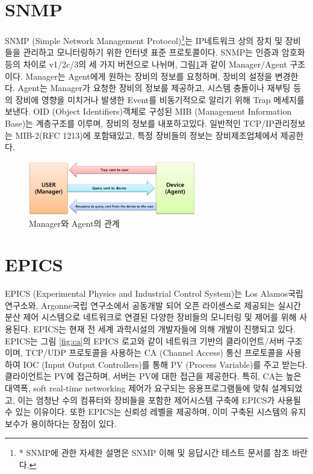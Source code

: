 \documentclass[11pt
  , a4paper
  , article
  , oneside
]{memoir}
\begin{document}
\section{SNMP}
SNMP (Simple Network Management Protocol)\footnote{* SNMP에 관한 자세한 설명은 SNMP 이해 및 응답시간 테스트 문서를 참조 바란다.}는 IP네트워크 상의 장치 및 장비들을 관리하고 모니터링하기 위한 인터넷 표준 프로토콜이다\citep{snmp}. SNMP는 인증과 암호화 등의 차이로 v1/2c/3의 세 가지 버전으로 나뉘며, 그림\ref{fig:relationship_m_a}과 같이 Manager/Agent 구조이다\citep{snmpm_a}. Manager는 Agent에게 원하는 장비의 정보를 요청하며, 장비의 설정을 변경한다. Agent는 Manager가 요청한 장비의 정보를 제공하고, 시스템 충돌이나 재부팅 등의 장비에 영향을 미치거나 발생한 Event를 비동기적으로 알리기 위해 Trap 메세지를 보낸다. OID (Object Identifiers)객체로 구성된 MIB (Management Information Base)는 계층구조를 이루며, 장비의 정보를 내포하고있다. 일반적인 TCP/IP관리정보는 MIB-2(RFC 1213)에 포함돼있고, 특정 장비들의 정보는 장비제조업체에서 제공한다. 

\begin{figure}[h!]
  \centering
  \includegraphics[width=0.65\textwidth]{./images/relationship_m_a.eps}
  \caption{Manager와 Agent의 관계}
  \label{fig:relationship_m_a}   
\end{figure}

\hfill

\section{EPICS}
EPICS (Experimental Physics and Industrial Control System)는 Los Alamos국립 연구소와, Argonne국립 연구소에서 공동개발 되어 오픈 라이센스로 제공되는 실시간 분산 제어 시스템으로 네트워크로 연결된 다양한 장비들의 모니터링 및 제어를 위해 사용된다. EPICS는 현재 전 세계 과학시설의 개발자들에 의해 개발이 진행되고 있다. EPICS는 그림 \ref{fig:ca}의 EPICS 로고와 같이 네트워크 기반의 클라이언트/서버 구조이며, TCP/UDP 프로토콜을 사용하는 CA (Channel Access) 통신 프로토콜을 사용하여 IOC (Input Output Controllers)를 통해 PV (Process Variable)를 주고 받는다. 클라이언트는 PV에 접근하며, 서버는 PV에 대한 접근을 제공한다. 특히, CA는 높은 대역폭, soft real-time networking 제어가 요구되는 응용프로그램들에 맞춰 설계되었고, 이는 엄청난 수의 컴퓨터와 장비들을 포함한 제어시스템 구축에 EPICS가 사용될 수 있는 이유이다. 또한 EPICS는 신뢰성 레벨을 제공하며, 이미 구축된 시스템의 유지보수가 용이하다는 장점이 있다\citep{epics}. 
\end{document}
